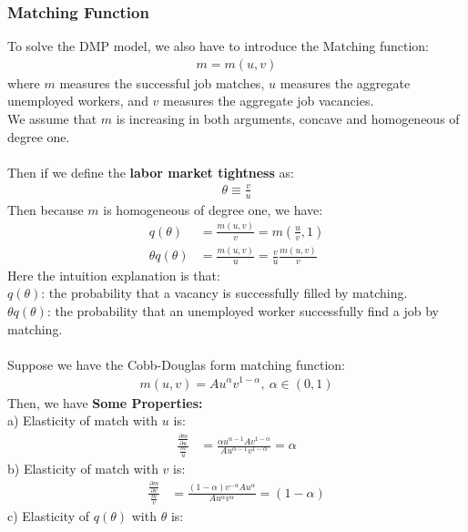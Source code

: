 \documentclass{article}
\begin{document}
\subsubsection{Matching Function}
To solve the DMP model, we also have to introduce the Matching function:
\begin{align*}
	m = m(u, v)
\end{align*}
where $m$ measures the successful job matches, $u$ measures the aggregate unemployed workers, and $v$ measures the aggregate job vacancies.\\
We assume that $m$ is increasing in both arguments, concave and homogeneous of degree one.\\\\
Then if we define the \textbf{labor market tightness} as:
\begin{align*}
	\theta \equiv \frac{v}{u}
\end{align*} 
Then because $m$ is homogeneous of degree one, we have:
\begin{align*}
	q(\theta) &= \frac{m(u, v)}{v} = m(\frac{u}{v}, 1)\\
	\theta q(\theta) &= \frac{m(u, v)}{u} = \frac{v}{u} \frac{m(u, v)}{v}
\end{align*}
Here the intuition explanation is that:\\
\indent $q(\theta)$: the probability that a vacancy is successfully filled by matching.\\
\indent $\theta q(\theta)$: the probability that an unemployed worker successfully find a job by matching.\\\\
Suppose we have the Cobb-Douglas form matching function:
\begin{align*}
	m(u, v) = Au^\alpha v^{1 - \alpha},\ \alpha \in (0, 1)
\end{align*}
Then, we have \textbf{Some Properties:}\\
\indent a) Elasticity of match with $u$ is:
\begin{align*}
	\frac{\frac{\partial m}{\partial u}}{\frac{m}{u}} &= \frac{\alpha u^{\alpha-1} A v^{1 - \alpha}}{Au^{\alpha - 1}v^{1 - \alpha}} = \alpha
\end{align*}
\indent b) Elasticity of match with $v$ is:
\begin{align*}
	\frac{\frac{\partial m}{\partial v}}{\frac{m}{v}} &= \frac{(1 - \alpha)v^{-\alpha}A u^{\alpha}}{A u^{\alpha} v^{\alpha}} = (1 - \alpha)
\end{align*}
\indent c) Elasticity of $q(\theta)$ with $\theta$ is:
\end{document}
